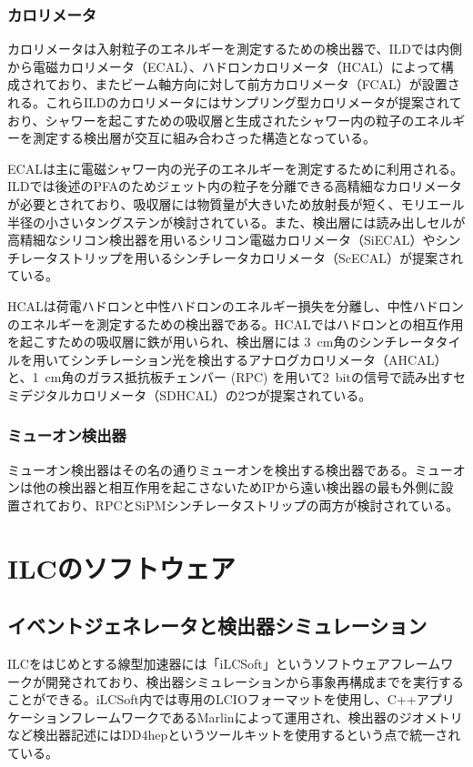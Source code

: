 \subsubsection{カロリメータ}
カロリメータは入射粒子のエネルギーを測定するための検出器で、ILDでは内側から電磁カロリメータ（ECAL）、ハドロンカロリメータ（HCAL）によって構成されており、またビーム軸方向に対して前方カロリメータ（FCAL）が設置される。これらILDのカロリメータにはサンプリング型カロリメータが提案されており、シャワーを起こすための吸収層と生成されたシャワー内の粒子のエネルギーを測定する検出層が交互に組み合わさった構造となっている。

ECALは主に電磁シャワー内の光子のエネルギーを測定するために利用される。ILDでは後述のPFAのためジェット内の粒子を分離できる高精細なカロリメータが必要とされており、吸収層には物質量が大きいため放射長が短く、モリエール半径の小さいタングステンが検討されている。また、検出層には読み出しセルが高精細なシリコン検出器を用いるシリコン電磁カロリメータ（SiECAL）やシンチレータストリップを用いるシンチレータカロリメータ（ScECAL）が提案されている。

HCALは荷電ハドロンと中性ハドロンのエネルギー損失を分離し、中性ハドロンのエネルギーを測定するための検出器である。HCALではハドロンとの相互作用を起こすための吸収層に鉄が用いられ、検出層には \SI{3}{cm}角のシンチレータタイルを用いてシンチレーション光を検出するアナログカロリメータ（AHCAL）と、1\, cm角のガラス抵抗板チェンバー (RPC) を用いて2\, bitの信号で読み出すセミデジタルカロリメータ（SDHCAL）の2つが提案されている。

\subsubsection{ミューオン検出器}
ミューオン検出器はその名の通りミューオンを検出する検出器である。ミューオンは他の検出器と相互作用を起こさないためIPから遠い検出器の最も外側に設置されており、RPCとSiPMシンチレータストリップの両方が検討されている。

\section{ILCのソフトウェア}
\subsection{イベントジェネレータと検出器シミュレーション}
ILCをはじめとする線型加速器には「iLCSoft」というソフトウェアフレームワークが開発されており、検出器シミュレーションから事象再構成までを実行することができる。iLCSoft内では専用のLCIOフォーマットを使用し、C++アプリケーションフレームワークであるMarlinによって運用され、検出器のジオメトリなど検出器記述にはDD4hepというツールキットを使用するという点で統一されている。

